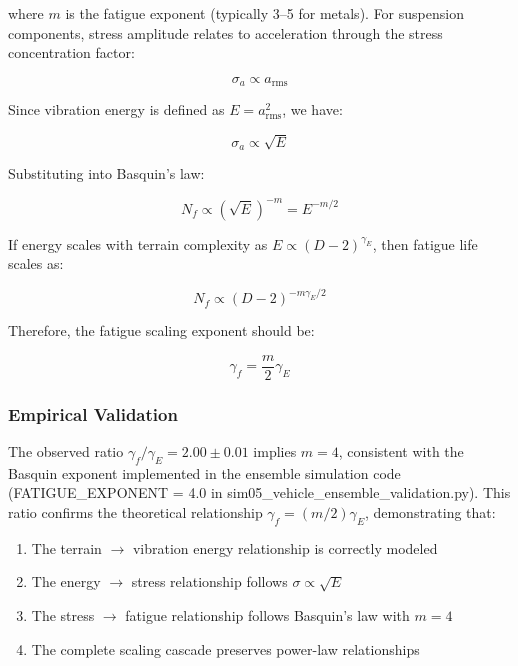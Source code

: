 \documentclass[11pt]{article}
\begin{document}
where $m$ is the fatigue exponent (typically 3--5 for metals). For suspension components, stress amplitude relates to acceleration through the stress concentration factor:

\begin{equation}
\sigma_a \propto a_{\text{rms}}
\end{equation}

Since vibration energy is defined as $E = a_{\text{rms}}^2$, we have:

\begin{equation}
\sigma_a \propto \sqrt{E}
\end{equation}

Substituting into Basquin's law:

\begin{equation}
N_f \propto (\sqrt{E})^{-m} = E^{-m/2}
\end{equation}

If energy scales with terrain complexity as $E \propto (D-2)^{\gamma_E}$, then fatigue life scales as:

\begin{equation}
N_f \propto (D-2)^{-m\gamma_E/2}
\end{equation}

Therefore, the fatigue scaling exponent should be:

\begin{equation}
\gamma_f = \frac{m}{2} \gamma_E
\end{equation}

\subsubsection{Empirical Validation}

The observed ratio $\gamma_f / \gamma_E = 2.00 \pm 0.01$ implies $m = 4$, consistent with the Basquin exponent implemented in the ensemble simulation code (FATIGUE\_EXPONENT = 4.0 in sim05\_vehicle\_ensemble\_validation.py). This ratio confirms the theoretical relationship $\gamma_f = (m/2)\gamma_E$, demonstrating that:

\begin{enumerate}
\item The terrain $\rightarrow$ vibration energy relationship is correctly modeled
\item The energy $\rightarrow$ stress relationship follows $\sigma \propto \sqrt{E}$
\item The stress $\rightarrow$ fatigue relationship follows Basquin's law with $m = 4$
\item The complete scaling cascade preserves power-law relationships
\end{enumerate}
\end{document}
